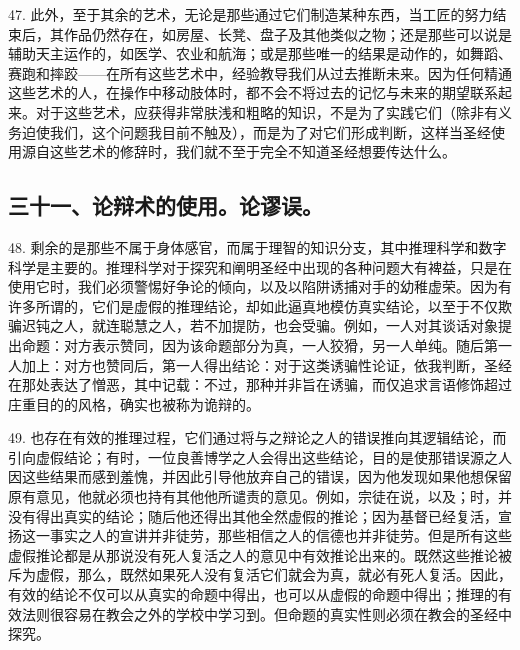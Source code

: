 47. 此外，至于其余的艺术，无论是那些通过它们制造某种东西，当工匠的努力结束后，其作品仍然存在，如房屋、长凳、盘子及其他类似之物；还是那些可以说是辅助天主运作的，如医学、农业和航海；或是那些唯一的结果是动作的，如舞蹈、赛跑和摔跤——在所有这些艺术中，经验教导我们从过去推断未来。因为任何精通这些艺术的人，在操作中移动肢体时，都不会不将过去的记忆与未来的期望联系起来。对于这些艺术，应获得非常肤浅和粗略的知识，不是为了实践它们（除非有义务迫使我们，这个问题我目前不触及），而是为了对它们形成判断，这样当圣经使用源自这些艺术的修辞时，我们就不至于完全不知道圣经想要传达什么。\par


\subsection{三十一、论辩术的使用。论谬误。}

48. 剩余的是那些不属于身体感官，而属于理智的知识分支，其中推理科学和数字科学是主要的。推理科学对于探究和阐明圣经中出现的各种问题大有裨益，只是在使用它时，我们必须警惕好争论的倾向，以及以陷阱诱捕对手的幼稚虚荣。因为有许多所谓的，它们是虚假的推理结论，却如此逼真地模仿真实结论，以至于不仅欺骗迟钝之人，就连聪慧之人，若不加提防，也会受骗。例如，一人对其谈话对象提出命题：对方表示赞同，因为该命题部分为真，一人狡猾，另一人单纯。随后第一人加上：对方也赞同后，第一人得出结论：对于这类诱骗性论证，依我判断，圣经在那处表达了憎恶，其中记载：不过，那种并非旨在诱骗，而仅追求言语修饰超过庄重目的的风格，确实也被称为诡辩的。\par

49. 也存在有效的推理过程，它们通过将与之辩论之人的错误推向其逻辑结论，而引向虚假结论；有时，一位良善博学之人会得出这些结论，目的是使那错误源之人因这些结果而感到羞愧，并因此引导他放弃自己的错误，因为他发现如果他想保留原有意见，他就必须也持有其他他所谴责的意见。例如，宗徒在说，以及；时，并没有得出真实的结论；随后他还得出其他全然虚假的推论；因为基督已经复活，宣扬这一事实之人的宣讲并非徒劳，那些相信之人的信德也并非徒劳。但是所有这些虚假推论都是从那说没有死人复活之人的意见中有效推论出来的。既然这些推论被斥为虚假，那么，既然如果死人没有复活它们就会为真，就必有死人复活。因此，有效的结论不仅可以从真实的命题中得出，也可以从虚假的命题中得出；推理的有效法则很容易在教会之外的学校中学习到。但命题的真实性则必须在教会的圣经中探究。\par

